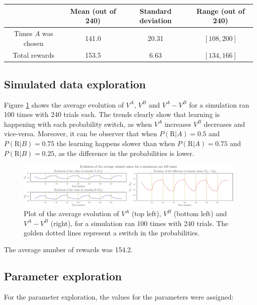 \documentclass[12pt]{article}
\begin{document}
\begin{center}
 \begin{tabular}{|c || c | c | c|} 
 \hline
  & Mean (out of 240) & Standard deviation & Range (out of 240) \\ [0.5ex] 
 \hline\hline
 Times $A$ was chosen & 141.0 & 20.31 & $[108, 200]$ \\ 
 \hline
 Total rewards & 153.5 & 6.63 & $[134,166]$ \\ [1ex] 
 \hline
\end{tabular}
\end{center}

\subsection{Simulated data exploration}

Figure \ref{fig:2.2} shows the average evolution of $V^A$, $V^B$ and $V^A - V^B$ for a simulation ran 100 times with 240 trials each. The trends clearly show that learning is happening with each probability switch, as when $V^A$ increases $V^B$ decreases and vice-versa. Moreover, it can be observer that when $P(\mathrm{R} | A) = 0.5 $ and $P(\mathrm{R} | B) = 0.75$ the learning happens slower than when $P(\mathrm{R} | A) = 0.75 $ and $P(\mathrm{R} | B) = 0.25$, as the difference in the probabilities is lower.

\begin{figure}[h!]
	\centering
	\hspace*{-0.4in}
	\includegraphics[width=1\linewidth]{figures/2.2.pdf}
	\caption{Plot of the average evolution of $V^A$ (top left), $V^B$ (bottom left) and $V^A - V^B$ (right), for a simulation ran 100 times with 240 trials. The golden dotted lines represent a switch in the probabilities.}
	\label{fig:2.2}
\end{figure}

The average number of rewards was 154.2.

\subsection{Parameter exploration}

For the parameter exploration, the values for the parameters were assigned:
\end{document}
